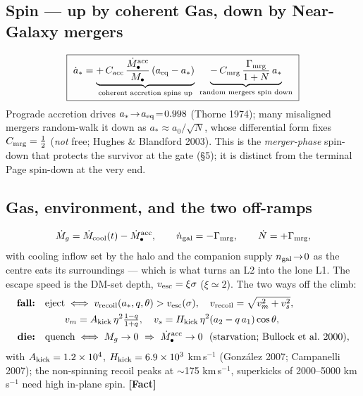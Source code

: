 \documentclass[11pt]{article}
\newcommand{\Fact}{\textbf{\textcolor{green!45!black}{[Fact]}}}
\newcommand{\Mbh}{M_{\bullet}}
\begin{document}
\subsection{Spin --- up by coherent Gas, down by Near-Galaxy mergers}
\begin{equation}
\boxed{\ \dot a_\ast=\underbrace{+\,C_{\rm acc}\,\frac{\dot\Mbh^{\rm acc}}{\Mbh}\,(a_{\rm eq}-a_\ast)}_{\text{coherent accretion spins up}}\ \underbrace{-\,C_{\rm mrg}\,\frac{\Gamma_{\rm mrg}}{1+N}\,a_\ast}_{\text{random mergers spin down}}\ }
\label{eq:spin}
\end{equation}
Prograde accretion drives $a_\ast\!\to\!a_{\rm eq}\!=\!0.998$ (Thorne 1974); many misaligned mergers random-walk it down as $a_\ast\!\approx\!a_0/\sqrt N$, whose differential form fixes $C_{\rm mrg}=\tfrac12$ (\emph{not} free; Hughes \& Blandford 2003). This is the \emph{merger-phase} spin-down that protects the survivor at the gate (\S5); it is distinct from the terminal Page spin-down at the very end.

\subsection{Gas, environment, and the two off-ramps}
\begin{equation}
\dot M_g=\dot M_{\rm cool}(t)-\dot\Mbh^{\rm acc},\qquad
\dot n_{\rm gal}=-\Gamma_{\rm mrg},\qquad \dot N=+\Gamma_{\rm mrg},
\label{eq:gasenv}
\end{equation}
with cooling inflow set by the halo and the companion supply $n_{\rm gal}\!\to\!0$ as the centre eats its surroundings --- which is what turns an L2 into the lone L1. The escape speed is the DM-set depth, $v_{\rm esc}=\xi\sigma$ ($\xi\!\simeq\!2$). The two ways off the climb:
\begin{align}
\text{\bf fall:}\quad & \text{eject}\iff v_{\rm recoil}(a_\ast,q,\theta)>v_{\rm esc}(\sigma),\quad v_{\rm recoil}=\sqrt{v_m^2+v_s^2},\\
&\qquad v_m=A_{\rm kick}\,\eta^2\tfrac{1-q}{1+q},\quad v_s=H_{\rm kick}\,\eta^2(a_2-q\,a_1)\cos\theta,\notag\\
\text{\bf die:}\quad & \text{quench}\iff M_g\to0\ \Rightarrow\ \dot\Mbh^{\rm acc}\to0\ \ (\text{starvation; Bullock et al.\ 2000}),
\end{align}
with $A_{\rm kick}=1.2\times10^4$, $H_{\rm kick}=6.9\times10^3$ km\,s$^{-1}$ (Gonz\'alez 2007; Campanelli 2007); the non-spinning recoil peaks at $\sim$175 km\,s$^{-1}$, superkicks of 2000--5000 km\,s$^{-1}$ need high in-plane spin. \Fact
\end{document}
